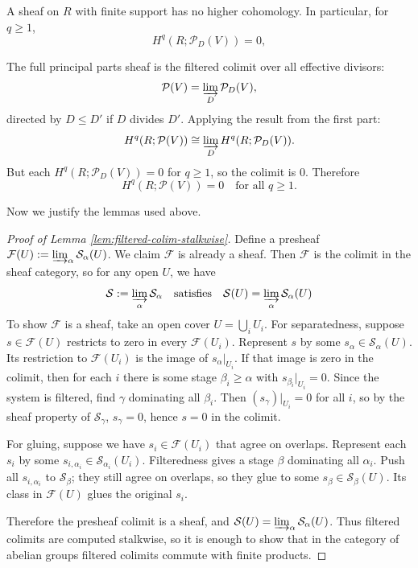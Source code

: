 \documentclass[12pt]{article}
\begin{document}
\begin{solution}
\begin{lemma}\label{lem:finite-support-no-coh}
    A sheaf on $R$ with finite support has no higher cohomology. In particular, for $q\geq1$,
    \[
    H^q(R;\mathcal{P}_D(V)) = 0,
    \]
\end{lemma}    
    The full principal parts sheaf is the filtered colimit over all effective divisors:
    \[
    \mathcal{P}(V) = \varinjlim_D \mathcal{P}_D(V),
    \]
    directed by $D\leq D'$ if $D$ divides $D'$. Applying the result from the first part:
    \[
    H^q(R;\mathcal{P}(V)) \cong \varinjlim_D H^q(R;\mathcal{P}_D(V)).
    \]
    But each $H^q(R;\mathcal{P}_D(V))=0$ for $q\geq1$, so the colimit is 0. Therefore
    \[
    H^q(R;\mathcal{P}(V)) = 0 \quad \text{for all } q\geq1.
    \]

    Now we justify the lemmas used above.
    \begin{proof}[Proof of Lemma \ref{lem:filtered-colim-stalkwise}]
        Define a presheaf $\mathcal{F}(U) := \varinjlim_\alpha \mathcal{S}_\alpha(U)$. We claim $\mathcal{F}$ is already a sheaf. Then $\mathcal{F}$ is the colimit in the sheaf category, so for any open $U$, we have
        \[
        \mathcal{S} := \varinjlim_\alpha \mathcal{S}_\alpha \quad\text{satisfies}\quad \mathcal{S}(U) = \varinjlim_\alpha \mathcal{S}_\alpha(U)
        \]
        To show $\mathcal{F}$ is a sheaf, take an open cover $U = \bigcup_i U_i$. For separatedness, suppose $s \in \mathcal{F}(U)$ restricts to zero in every $\mathcal{F}(U_i)$. Represent $s$ by some $s_\alpha \in \mathcal{S}_\alpha(U)$. Its restriction to $\mathcal{F}(U_i)$ is the image of $s_\alpha|_{U_i}$. If that image is zero in the colimit, then for each $i$ there is some stage $\beta_i\geq\alpha$ with $s_{\beta_i}|_{U_i}=0$. Since the system is filtered, find $\gamma$ dominating all $\beta_i$. Then $(s_\gamma)|_{U_i}=0$ for all $i$, so by the sheaf property of $\mathcal{S}_\gamma$, $s_\gamma=0$, hence $s=0$ in the colimit.

        For gluing, suppose we have $s_i \in \mathcal{F}(U_i)$ that agree on overlaps. Represent each $s_i$ by some $s_{i,\alpha_i}\in \mathcal{S}_{\alpha_i}(U_i)$. Filteredness gives a stage $\beta$ dominating all $\alpha_i$. Push all $s_{i,\alpha_i}$ to $\mathcal{S}_\beta$; they still agree on overlaps, so they glue to some $s_\beta\in \mathcal{S}_\beta(U)$. Its class in $\mathcal{F}(U)$ glues the original $s_i$.

        Therefore the presheaf colimit is a sheaf, and $\mathcal{S}(U)=\varinjlim_\alpha \mathcal{S}_\alpha(U)$. Thus filtered colimits are computed stalkwise, so it is enough to show that in the category of abelian groups filtered colimits commute with finite products. 
    \end{proof}


\end{solution}
\end{document}
